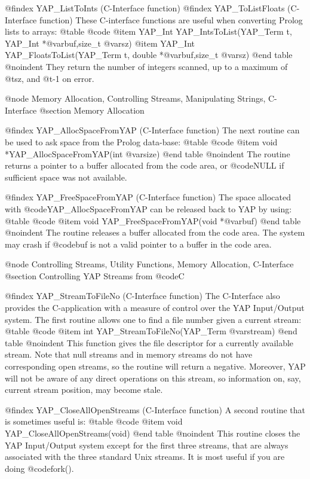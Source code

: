 @findex YAP_ListToInts (C-Interface function)
@findex YAP_ToListFloats (C-Interface function)
These C-interface functions are useful when converting Prolog lists to arrays:
@table @code
@item      YAP_Int YAP_IntsToList(YAP_Term t, YAP_Int *@var{buf},size_t @var{sz})
@item      YAP_Int YAP_FloatsToList(YAP_Term t, double *@var{buf},size_t @var{sz})
@end table
@noindent
They return the number of integers scanned, up to a maximum of @t{sz},
and @t{-1} on error.

@node Memory Allocation, Controlling Streams, Manipulating Strings, C-Interface
@section Memory Allocation

@findex YAP_AllocSpaceFromYAP (C-Interface function)
The next routine can be used to ask space from the Prolog data-base:
@table @code
 @item     void      *YAP_AllocSpaceFromYAP(int @var{size})
@end table
@noindent
The routine returns a pointer to a buffer allocated from the code area,
or @code{NULL} if sufficient space was not available.

@findex YAP_FreeSpaceFromYAP (C-Interface function)
The space allocated with @code{YAP_AllocSpaceFromYAP} can be released
back to YAP by using:
@table @code
 @item     void      YAP_FreeSpaceFromYAP(void *@var{buf})
@end table
@noindent
The routine releases a buffer allocated from the code area. The system
may crash if @code{buf} is not a valid pointer to a buffer in the code
area.

@node Controlling Streams, Utility Functions, Memory Allocation, C-Interface
@section Controlling YAP Streams from @code{C}

@findex YAP_StreamToFileNo (C-Interface function)
The C-Interface also provides the C-application with a measure of
control over the YAP Input/Output system. The first routine allows one
to find a file number given a current stream:
@table @code
 @item     int      YAP_StreamToFileNo(YAP_Term @var{stream})
@end table
@noindent
This function gives the file descriptor for a currently available
stream. Note that null streams and in memory streams do not have
corresponding open streams, so the routine will return a
negative. Moreover, YAP will not be aware of any direct operations on
this stream, so information on, say, current stream position, may become
stale.

@findex YAP_CloseAllOpenStreams (C-Interface function)
A second routine that is sometimes useful is:
@table @code
@item      void      YAP_CloseAllOpenStreams(void)
@end table
@noindent
This routine closes the YAP Input/Output system except for the first
three streams, that are always associated with the three standard Unix
streams. It is most useful if you are doing @code{fork()}.

